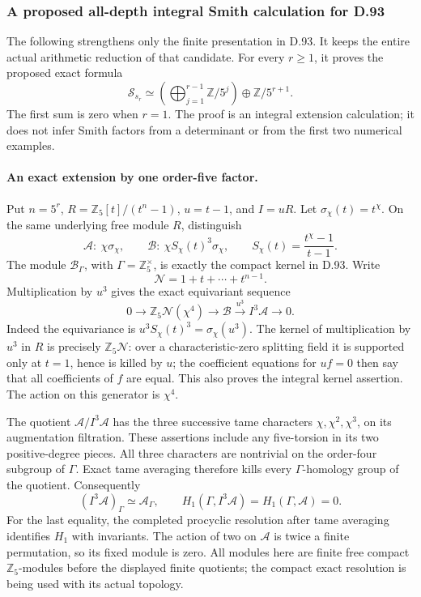 \subsubsection{A proposed all-depth integral Smith calculation for D.93}

The following strengthens only the finite presentation in D.93.
It keeps the entire actual arithmetic reduction of that candidate.
For every \(r\ge1\), it proves the proposed exact formula
\[
 \mathcal S_{s_r}\simeq
 \left(\bigoplus_{j=1}^{r-1}\mathbb Z/5^j\right)
       \oplus\mathbb Z/5^{r+1}.                       \tag{D93S.1}
\]
The first sum is zero when \(r=1\). The proof is an integral
extension calculation; it does not infer Smith factors from a
determinant or from the first two numerical examples.

\paragraph{An exact extension by one order-five factor.}
Put \(n=5^r\), \(R=\mathbb Z_5[t]/(t^n-1)\), \(u=t-1\),
and \(I=uR\). Let \(\sigma_\chi(t)=t^\chi\).
On the same underlying free module \(R\), distinguish
\[
 \mathscr A:\ \chi\sigma_\chi,\qquad
 \mathscr B:\ \chi S_\chi(t)^3\sigma_\chi,
       \qquad S_\chi(t)=\frac{t^\chi-1}{t-1}.
\]
The module \(\mathscr B_\Gamma\), with
\(\Gamma=\mathbb Z_5^\times\), is exactly the compact kernel
in D.93. Write
\[
                  \mathcal N=1+t+\cdots+t^{n-1}.
\]
Multiplication by \(u^3\) gives the exact equivariant sequence
\[
 0\longrightarrow \mathbb Z_5\mathcal N(\chi^4)
   \longrightarrow \mathscr B
   \xrightarrow{u^3} I^3\mathscr A
   \longrightarrow0.                                \tag{D93S.2}
\]
Indeed the equivariance is
\(u^3 S_\chi(t)^3=\sigma_\chi(u^3)\).
The kernel of multiplication by \(u^3\) in \(R\) is precisely
\(\mathbb Z_5\mathcal N\): over a characteristic-zero splitting
field it is supported only at \(t=1\), hence is killed by \(u\);
the coefficient equations for \(u f=0\) then say that all
coefficients of \(f\) are equal. This also proves the integral
kernel assertion. The action on this generator is \(\chi^4\).

The quotient \(\mathscr A/I^3\mathscr A\) has the three
successive tame characters \(\chi,\chi^2,\chi^3\), on its
augmentation filtration. These assertions include any
five-torsion in its two positive-degree pieces. All three
characters are nontrivial on the order-four subgroup of
\(\Gamma\). Exact tame averaging therefore kills every
\(\Gamma\)-homology group of the quotient. Consequently
\[
 (I^3\mathscr A)_\Gamma\simeq\mathscr A_\Gamma,
 \qquad H_1(\Gamma,I^3\mathscr A)=H_1(\Gamma,\mathscr A)=0.
                                                               \tag{D93S.3}
\]
For the last equality, the completed procyclic resolution
after tame averaging identifies \(H_1\) with invariants.
The action of two on \(\mathscr A\) is twice a finite
permutation, so its fixed module is zero. All modules here
are finite free compact \(\mathbb Z_5\)-modules before the
displayed finite quotients; the compact exact resolution is
being used with its actual topology.

